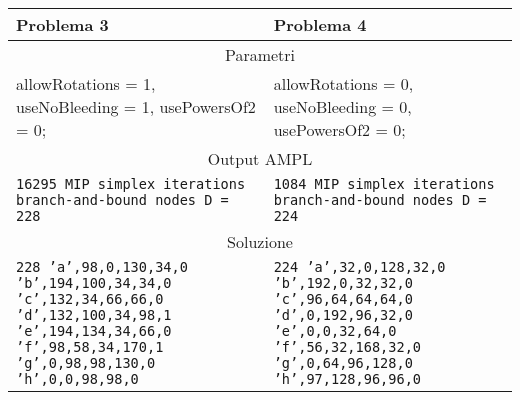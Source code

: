 \begin{table}[H]
\centering
\footnotesize
\begin{tabular}{p{6cm}|p{6cm}}
\textbf{Problema 3} & \textbf{Problema 4} \\
\hline
\multicolumn{2}{|c|}{Parametri} \\ 
\hline
allowRotations = 1,\newline
useNoBleeding = 1,\newline
usePowersOf2 = 0;	& 
allowRotations = 0,\newline
useNoBleeding = 0,\newline
usePowersOf2 = 0;	\\
\hline
\multicolumn{2}{|c|}{Output AMPL} \\
\hline
\texttt{16295 MIP simplex iterations\newline
2405 branch-and-bound nodes\newline
D = 228}
&
\texttt{1084 MIP simplex iterations\newline
277 branch-and-bound nodes\newline
D = 224}
\\
\hline
\multicolumn{2}{|c|}{Soluzione} \\
\hline
\texttt{228\newline
'a',98,0,130,34,0\newline
'b',194,100,34,34,0\newline
'c',132,34,66,66,0\newline
'd',132,100,34,98,1\newline
'e',194,134,34,66,0\newline
'f',98,58,34,170,1\newline
'g',0,98,98,130,0\newline
'h',0,0,98,98,0}
&
\texttt{224\newline
'a',32,0,128,32,0\newline
'b',192,0,32,32,0\newline
'c',96,64,64,64,0\newline
'd',0,192,96,32,0\newline
'e',0,0,32,64,0\newline
'f',56,32,168,32,0\newline
'g',0,64,96,128,0\newline
'h',97,128,96,96,0}
\\
\end{tabular}
\end{table}













